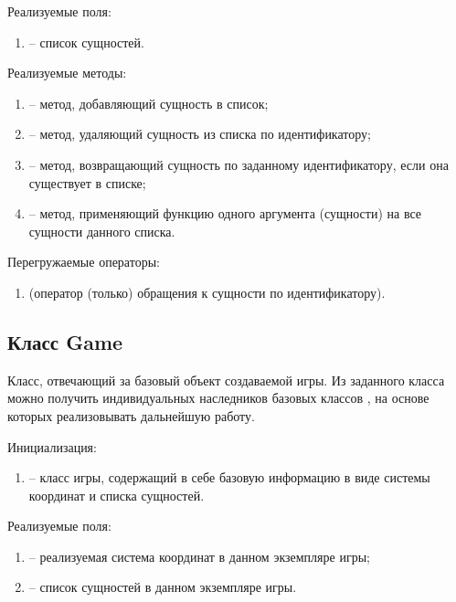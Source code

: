 	\noindent Реализуемые поля:
	\begin{enumerate}
		\item {} -- список сущностей.
	\end{enumerate}

	\noindent Реализуемые методы:
	\begin{enumerate}
		\item {} -- метод, добавляющий сущность в список;
		\item {} -- метод, удаляющий сущность из списка по идентификатору;
		\item {} -- метод, возвращающий сущность по заданному идентификатору, если она существует в списке;
		\item {} -- метод, применяющий функцию одного аргумента (сущности) на все сущности данного списка.
	\end{enumerate}

	\noindent Перегружаемые операторы:
	\begin{enumerate}
		\item {} (оператор (только) обращения к сущности по идентификатору).
	\end{enumerate}

\subsection{Класс Game}
	\noindent Класс, отвечающий за базовый объект создаваемой игры. Из заданного класса можно получить индивидуальных наследников базовых классов , на основе которых реализовывать дальнейшую работу.

	\noindent Инициализация:
	\begin{enumerate}
		\item {} -- класс игры, содержащий в себе базовую информацию в виде системы координат и списка сущностей.
	\end{enumerate}

	\noindent Реализуемые поля:
	\begin{enumerate}
		\item {} -- реализуемая система координат в данном экземпляре игры;
		\item {} -- список сущностей в данном экземпляре игры.
	\end{enumerate}

